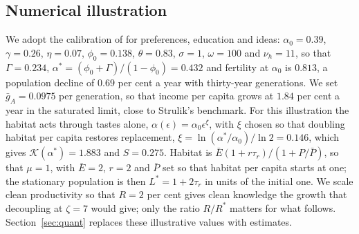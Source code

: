 \documentclass[11pt]{article}
\begin{document}
\subsection{Numerical illustration}
\label{sub:illustration}
\label{sec:calibration}
We adopt the calibration of \citet[Section~3.2]{STRULIK2024104943} for preferences, education and
ideas: $\alpha_0=0.39$, $\gamma=0.26$, $\eta=0.07$, $\phi_0=0.138$, $\theta=0.83$, $\sigma=1$, $\omega=100$
and $\nu_h=11$, so that $\Gamma=0.234$, $\alpha^\ast=(\phi_0+\Gamma)/(1-\phi_0)=0.432$ and fertility
at $\alpha_0$ is $0.813$, a population decline of $0.69$ per cent a year with thirty-year generations.
We set $\bar g_A=0.0975$ per generation, so that income per capita grows at $1.84$ per cent a year in the
saturated limit, close to Strulik's benchmark. For this illustration the habitat acts through tastes
alone, $\alpha(\epsilon)=\alpha_0\epsilon^{\xi}$, with $\xi$ chosen so that doubling habitat per capita
restores replacement, $\xi=\ln(\alpha^\ast/\alpha_0)/\ln2=0.146$, which gives
$\mathcal{K}(\alpha^\ast)=1.883$ and $S=0.275$. Habitat is $\bar E(1+r\tau_r)/(1+P/\bar P)$, so that
$\mu=1$, with $\bar E=2$, $r=2$ and $\bar P$ set so that habitat per capita starts at one; the stationary
population is then $L^\ast=1+2\tau_r$ in units of the initial one. We scale clean productivity so that
$R=2$ per cent gives clean knowledge the growth that decoupling at $\zeta=7$ would give; only the
ratio $R/R^\ast$ matters for what follows. Section~\ref{sec:quant} replaces these illustrative values with
estimates.
\end{document}
